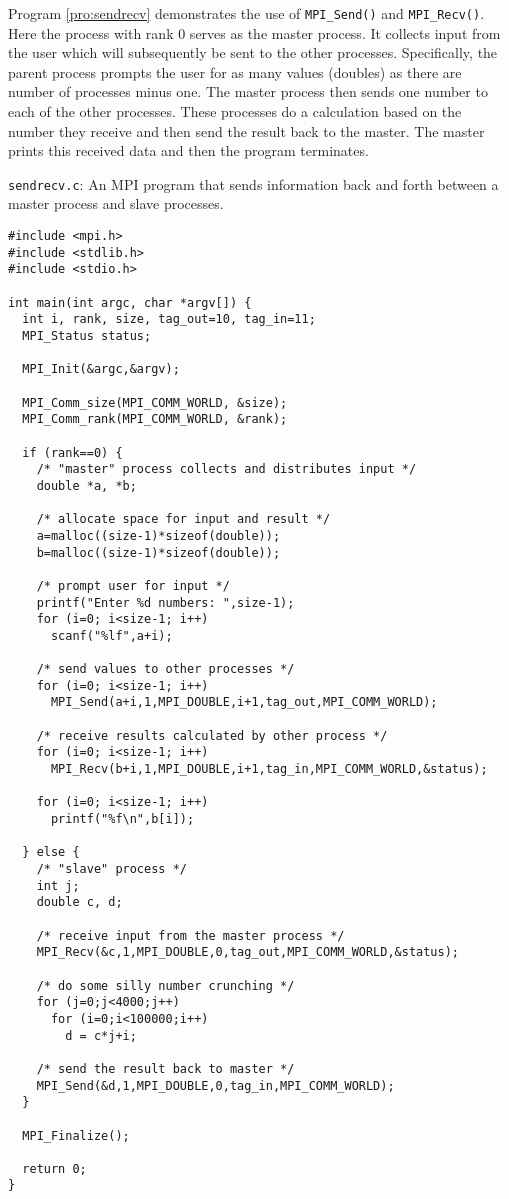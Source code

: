 Program \ref{pro:sendrecv} demonstrates the use of {\tt MPI\_Send()} and
{\tt MPI\_Recv()}.  Here the process with rank $0$ serves as the master
process.  It collects input from the user which will subsequently be
sent to the other processes.  Specifically, the parent process prompts
the user for as many values (doubles) as there are number of processes
minus one.  The master process then sends one number to each of the
other processes.  These processes do a calculation based on the
number they receive and then send the result back to the master.  The
master prints this received data and then the program terminates.

\begin{program}
{\tt sendrecv.c}: An MPI program that sends information back and forth
between a master process and slave processes.  \label{pro:sendrecv}
\codemiddle
\begin{lstlisting}
#include <mpi.h>
#include <stdlib.h>
#include <stdio.h>

int main(int argc, char *argv[]) {
  int i, rank, size, tag_out=10, tag_in=11;
  MPI_Status status;
  
  MPI_Init(&argc,&argv);
  
  MPI_Comm_size(MPI_COMM_WORLD, &size);
  MPI_Comm_rank(MPI_COMM_WORLD, &rank);

  if (rank==0) {
    /* "master" process collects and distributes input */
    double *a, *b;

    /* allocate space for input and result */
    a=malloc((size-1)*sizeof(double));
    b=malloc((size-1)*sizeof(double));

    /* prompt user for input */
    printf("Enter %d numbers: ",size-1);
    for (i=0; i<size-1; i++)
      scanf("%lf",a+i);

    /* send values to other processes */
    for (i=0; i<size-1; i++)
      MPI_Send(a+i,1,MPI_DOUBLE,i+1,tag_out,MPI_COMM_WORLD);

    /* receive results calculated by other process */
    for (i=0; i<size-1; i++)
      MPI_Recv(b+i,1,MPI_DOUBLE,i+1,tag_in,MPI_COMM_WORLD,&status);

    for (i=0; i<size-1; i++)
      printf("%f\n",b[i]);

  } else {
    /* "slave" process */
    int j;
    double c, d;

    /* receive input from the master process */
    MPI_Recv(&c,1,MPI_DOUBLE,0,tag_out,MPI_COMM_WORLD,&status);
    
    /* do some silly number crunching */
    for (j=0;j<4000;j++)
      for (i=0;i<100000;i++)
        d = c*j+i;
    
    /* send the result back to master */
    MPI_Send(&d,1,MPI_DOUBLE,0,tag_in,MPI_COMM_WORLD);
  }
  
  MPI_Finalize();
  
  return 0;
}
\end{lstlisting}
\end{program}

